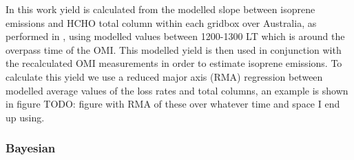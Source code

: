       In this work yield is calculated from the modelled slope between isoprene emissions and HCHO total column within each gridbox over Australia, as performed in \textcite{Palmer2003}, using modelled values between 1200-1300 LT which is around the overpass time of the OMI.
      This modelled yield is then used in conjunction with the recalculated OMI measurements in order to estimate isoprene emissions.
      To calculate this yield we use a reduced major axis (RMA) regression between modelled average values of the loss rates and total columns, an example is shown in figure TODO: figure with RMA of these over whatever time and space I end up using.
      
    
    \subsubsection{Bayesian}
      

